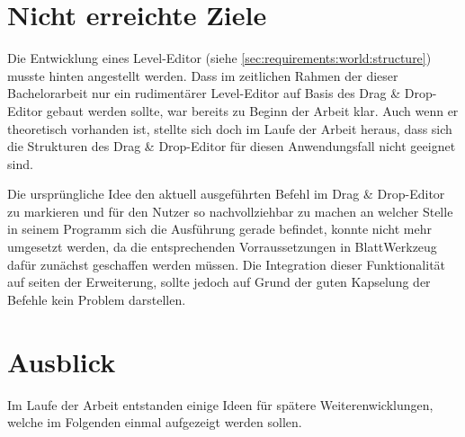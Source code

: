 \section{Nicht erreichte Ziele}
\label{sec:conclusion:open}

Die Entwicklung eines Level-Editor (siehe \ref{sec:requirements:world:structure}) musste hinten angestellt werden. Dass im zeitlichen Rahmen der dieser Bachelorarbeit nur ein rudimentärer Level-Editor auf Basis des Drag \& Drop-Editor gebaut werden sollte, war bereits zu Beginn der Arbeit klar. Auch wenn er theoretisch vorhanden ist, stellte sich doch im Laufe der Arbeit heraus, dass sich die Strukturen des Drag \& Drop-Editor für diesen Anwendungsfall nicht geeignet sind.

Die ursprüngliche Idee den aktuell ausgeführten Befehl im Drag \& Drop-Editor zu markieren und für den Nutzer so nachvollziehbar zu machen an welcher Stelle in seinem Programm sich die Ausführung gerade befindet, konnte nicht mehr umgesetzt werden, da die entsprechenden Vorraussetzungen in BlattWerkzeug dafür zunächst geschaffen werden müssen. Die Integration dieser Funktionalität auf seiten der Erweiterung, sollte jedoch auf Grund der guten Kapselung der Befehle kein Problem darstellen.

\section{Ausblick}
\label{sec:conclusion:future}

Im Laufe der Arbeit entstanden einige Ideen für spätere Weiterenwicklungen, welche im Folgenden einmal aufgezeigt werden sollen.

